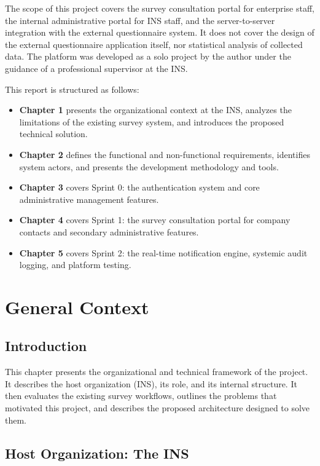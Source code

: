 \documentclass[12pt,a4paper]{report}
\begin{document}
The scope of this project covers the survey consultation portal for enterprise staff, the internal administrative portal for INS staff, and the server-to-server integration with the external questionnaire system. It does not cover the design of the external questionnaire application itself, nor statistical analysis of collected data. The platform was developed as a solo project by the author under the guidance of a professional supervisor at the INS.

This report is structured as follows:
\begin{itemize}
    \item \textbf{Chapter 1} presents the organizational context at the INS, analyzes the limitations of the existing survey system, and introduces the proposed technical solution.
    \item \textbf{Chapter 2} defines the functional and non-functional requirements, identifies system actors, and presents the development methodology and tools.
    \item \textbf{Chapter 3} covers Sprint 0: the authentication system and core administrative management features.
    \item \textbf{Chapter 4} covers Sprint 1: the survey consultation portal for company contacts and secondary administrative features.
    \item \textbf{Chapter 5} covers Sprint 2: the real-time notification engine, systemic audit logging, and platform testing.
\end{itemize}

\chapter{General Context}

\section{Introduction}
This chapter presents the organizational and technical framework of the project. It describes the host organization (INS), its role, and its internal structure. It then evaluates the existing survey workflows, outlines the problems that motivated this project, and describes the proposed architecture designed to solve them.

\section{Host Organization: The INS}
\end{document}
